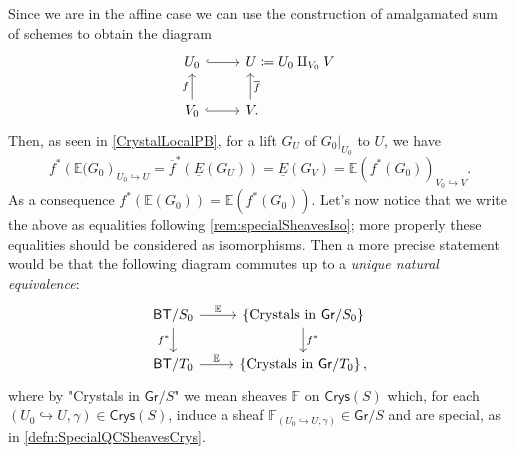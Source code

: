 \begin{rem}\label{PBCrystals}
	Since we are in the affine case we can use the construction of amalgamated
	sum of schemes to obtain the diagram
	\begin{equation*}
	\begin{tikzcd}[/tikz/column 2/.append style={anchor=base west}]
		U_0 \arrow[r, "", hookrightarrow] &
		U \coloneqq U_0 \amalg_{V_0} V \\
		V_0 \arrow[u, "f", rightarrow] 
		\arrow[r, "", hookrightarrow] &
		V \arrow[u, "\overline{f}"', rightarrow, end anchor={[xshift=1.84ex,yshift=0.29ex]south west},
		start anchor={[xshift=0.38ex]}] 
	.\end{tikzcd}
	\end{equation*}
	Then, as seen in \cref{CrystalLocalPB}, for a lift $G_U$ 
	of $\left.G_0\right|_{U_0}$ to $U$, we have
	\begin{equation*}
		f^* \left( \mathbb{E}(G_0 \right)_{ U_0 \hookrightarrow U } =
		\overline{f}^* \left( \underline{E}(G_U) \right) =
		\underline{E}(G_V) = \mathbb{E} \left( f^* (G_0) \right)_{V_0 \hookrightarrow V}
	.\end{equation*}
	As a consequence $f^* \left( \mathbb{E}(G_0) \right) =
	\mathbb{E}\left( f^*(G_0) \right)$.
	Let's now notice that we write the above as equalities following \cref{rem:specialSheavesIso};
	more properly these equalities should be considered as isomorphisms.
	Then a more precise statement would be that the following diagram
	commutes up to a \emph{unique natural equivalence}:
	\begin{equation*}
	\begin{tikzcd}
		\mathsf{BT}/S_0
		\arrow[r, "\mathbb{E}", rightarrow] 
		\arrow[d, "f^*"', rightarrow] &
		\left\{ \text{Crystals in } \mathsf{Gr}/S_0 \right\}
		\arrow[d, "f^*", rightarrow] \\
		\mathsf{BT}/T_0 \arrow[r, "\mathbb{E}", rightarrow] &
		\left\{ \text{Crystals in } \mathsf{Gr}/T_0 \right\}
	,\end{tikzcd}
	\end{equation*}
	where by "Crystals in $\mathsf{Gr}/S$" we mean sheaves $\mathbb{F}$ on $\mathsf{Crys}(S)$
	which, for each $\left(U_0 \hookrightarrow U, \gamma\right) \in \mathsf{Crys}(S)$,
	induce a sheaf $\mathbb{F}_{\left(U_0 \hookrightarrow U, \gamma\right)} \in \mathsf{Gr}/S$
	and are special, as in \cref{defn:SpecialQCSheavesCrys}.
\end{rem}


